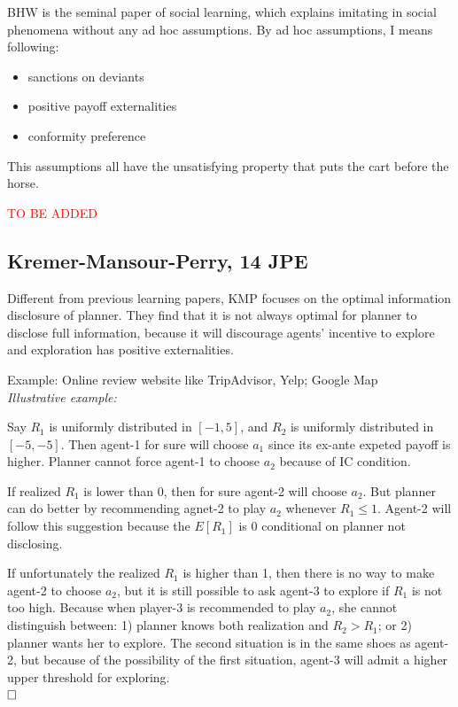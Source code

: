 \documentclass{book}
\theoremstyle{plain}
\theoremstyle{definition}
\begin{document}
\textbf{}

BHW is the seminal paper of social learning, which explains imitating in social phenomena without any ad hoc assumptions. By ad hoc assumptions, I means following:
\begin{itemize}
	\setlength{\itemsep}{0pt}
	\item sanctions on deviants
	\item positive payoff externalities
	\item conformity preference
\end{itemize}
This assumptions all have the unsatisfying property that puts the cart before the horse.

\textcolor{red}{TO BE ADDED}




\subsection{Kremer-Mansour-Perry, 14 JPE} %
\label{subsec:kremer_mansour_perry_14_jpe}

\textbf{}

Different from previous learning papers, KMP focuses on the optimal information disclosure of planner.
They find that it is not always optimal for planner to disclose full information, because it will discourage agents' incentive to explore and exploration has positive externalities.

Example: Online review website like TripAdvisor, Yelp; Google Map\\

\noindent
\textit{Illustrative example:}

Say $R_1$ is uniformly distributed in $[-1,5]$, and $R_2$ is uniformly distributed in $[-5,-5]$.
Then agent-1 for sure will choose $a_1$ since its ex-ante expeted payoff is higher.
Planner cannot force agent-1 to choose $a_2$ because of IC condition.

If realized $R_1$ is lower than 0, then for sure agent-2 will choose $a_2$.
But planner can do better by recommending agnet-2 to play $a_2$ whenever $R_1 \leq 1$.
Agent-2 will follow this suggestion because the $E[R_1]$ is 0 conditional on planner not disclosing.

If unfortunately the realized $R_1$ is higher than 1, then there is no way to make agent-2 to choose $a_2$,
but it is still possible to ask agent-3 to explore if $R_1$ is not too high.
Because when player-3 is recommended to play $a_2$, she cannot distinguish between:
1) planner knows both realization and $R_2>R_1$;
or 2) planner wants her to explore.
The second situation is in the same shoes as agent-2,
but because of the possibility of the first situation,
agent-3 will admit a higher upper threshold for exploring.\\
$\hfill\square$
\end{document}
